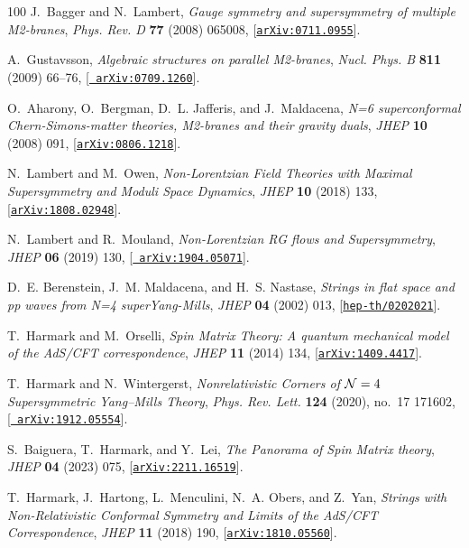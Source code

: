 \documentclass[11pt]{article}
\begin{document}
\begin{thebibliography}{100}
J.~Bagger and N.~Lambert, {\it {Gauge symmetry and supersymmetry of multiple
  M2-branes}},  {\em Phys. Rev. D} {\bf 77} (2008) 065008,
  [\href{http://arxiv.org/abs/0711.0955}{{\tt arXiv:0711.0955}}].

A.~Gustavsson, {\it {Algebraic structures on parallel M2-branes}},  {\em Nucl.
  Phys. B} {\bf 811} (2009) 66--76, [\href{http://arxiv.org/abs/0709.1260}{{\tt
  arXiv:0709.1260}}].

O.~Aharony, O.~Bergman, D.~L. Jafferis, and J.~Maldacena, {\it {N=6
  superconformal Chern-Simons-matter theories, M2-branes and their gravity
  duals}},  {\em JHEP} {\bf 10} (2008) 091,
  [\href{http://arxiv.org/abs/0806.1218}{{\tt arXiv:0806.1218}}].

N.~Lambert and M.~Owen, {\it {Non-Lorentzian Field Theories with Maximal
  Supersymmetry and Moduli Space Dynamics}},  {\em JHEP} {\bf 10} (2018) 133,
  [\href{http://arxiv.org/abs/1808.02948}{{\tt arXiv:1808.02948}}].

N.~Lambert and R.~Mouland, {\it {Non-Lorentzian RG flows and Supersymmetry}},
  {\em JHEP} {\bf 06} (2019) 130, [\href{http://arxiv.org/abs/1904.05071}{{\tt
  arXiv:1904.05071}}].

D.~E. Berenstein, J.~M. Maldacena, and H.~S. Nastase, {\it {Strings in flat
  space and pp waves from N=4 superYang-Mills}},  {\em JHEP} {\bf 04} (2002)
  013, [\href{http://arxiv.org/abs/hep-th/0202021}{{\tt hep-th/0202021}}].

T.~Harmark and M.~Orselli, {\it {Spin Matrix Theory: A quantum mechanical model
  of the AdS/CFT correspondence}},  {\em JHEP} {\bf 11} (2014) 134,
  [\href{http://arxiv.org/abs/1409.4417}{{\tt arXiv:1409.4417}}].

T.~Harmark and N.~Wintergerst, {\it {Nonrelativistic Corners of ${\cal N} = 4$
  Supersymmetric Yang--Mills Theory}},  {\em Phys. Rev. Lett.} {\bf 124}
  (2020), no.~17 171602, [\href{http://arxiv.org/abs/1912.05554}{{\tt
  arXiv:1912.05554}}].

S.~Baiguera, T.~Harmark, and Y.~Lei, {\it {The Panorama of Spin Matrix
  theory}},  {\em JHEP} {\bf 04} (2023) 075,
  [\href{http://arxiv.org/abs/2211.16519}{{\tt arXiv:2211.16519}}].

T.~Harmark, J.~Hartong, L.~Menculini, N.~A. Obers, and Z.~Yan, {\it {Strings
  with Non-Relativistic Conformal Symmetry and Limits of the AdS/CFT
  Correspondence}},  {\em JHEP} {\bf 11} (2018) 190,
  [\href{http://arxiv.org/abs/1810.05560}{{\tt arXiv:1810.05560}}].


\end{thebibliography}
\end{document}

